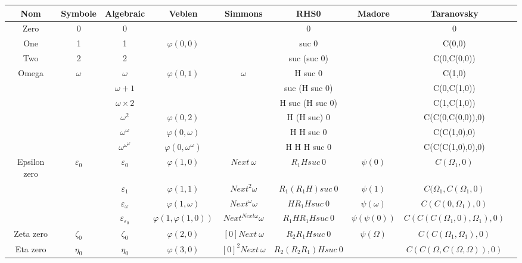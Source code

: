 \documentclass[10pt]{article}
\begin{document}
\begin{tabular}{|c|c|c|c|c|c|c|c|c|}
\hline
Nom		& Symbole		& Algebraic			& Veblen			& Simmons			& RHS0 		& Madore				& Taranovsky 			\\
\hline
Zero		& 0			& 0				& 				& 				& 0			& 					& 0				\\ \hline
One		& 1			& 1				& \(\varphi(0,0)\)		& 				& suc 0			& 					& C(0,0)			\\ \hline
Two		& 2			& 2				& 				& 				& suc (suc 0)		& 					& C(0,C(0,0))			\\ \hline
Omega		& \(\omega\)		& \(\omega\)			& \(\varphi(0,1)\)		& \(\omega\)			& H suc 0		& 					& C(1,0)			\\ \hline
		& 			& \(\omega+1\)			& 				& 				& suc (H suc 0)		& 					& C(0,C(1,0))			\\ \hline
		&			& \(\omega\times2\)		&				& 				& H suc (H suc 0)	& 					& C(1,C(1,0))			\\ \hline
		&			& \(\omega^2\)			& \(\varphi(0,2)\)		& 				& H (H suc) 0		& 					& C(C(0,C(0,0)),0)		\\ \hline
		&			& \(\omega^\omega\)		& \(\varphi(0,\omega)\)		& 				& H H suc 0		& 					& C(C(1,0),0)			\\ \hline
		&			& \(\omega^{\omega^\omega}\)	& \(\varphi(0,\omega^\omega)\)	&				& H H H suc 0		&					& C(C(C(1,0),0),0)		\\ \hline
Epsilon zero	& \(\varepsilon_0\)	& \(\varepsilon_0\)		& \(\varphi(1,0)\)		& \(Next\ \omega\)		& \(R_1 H suc\ 0\)	& \(\psi(0)\)				& \(C(\Omega_1,0)\)		\\ \hline
		& 			& \(\varepsilon_1\)		& \(\varphi(1,1)\)		& \(Next^2 \omega\)	& \(R_1 (R_1 H) suc\ 0\)& \(\psi(1)\)				& \(C(\Omega_1,C(\Omega_1,0)\)	\\ \hline
		& 			& \(\varepsilon_\omega\)	& \(\varphi(1,\omega)\) 	& \(Next^\omega \omega\) & \(H R_1 H suc\ 0\)	& \(\psi(\omega)\)			& \(C(C(0,\Omega_1),0)\)	\\ \hline
		& 			&\(\varepsilon_{\varepsilon_0}\)& \(\varphi(1,\varphi(1,0))\)	& \(Next^{Next \omega} \omega \) & \(R_1 H R_1 H suc\ 0\)& \(\psi(\psi(0))\)			& \(C(C(C(\Omega_1,0),\Omega_1),0)\)\\ \hline
Zeta zero	& \(\zeta_0\)		& \(\zeta_0\)			& \(\varphi(2,0)\)		& \([0] Next\ \omega\)		& \(R_2 R_1 H suc\ 0\)	& \(\psi(\Omega)\)			& \(C(C(\Omega_1,\Omega_1),0)\)	\\ \hline
Eta zero	& \(\eta_0\)		& \(\eta_0\)			& \(\varphi(3,0)\)		& \([0]^2 Next\ \omega\) 	& \(R_2 (R_2 R_1) H suc\ 0\)&					& \(C(C(\Omega,C(\Omega,\Omega)),0)\) \\ \hline

\end{tabular}
\end{document}

